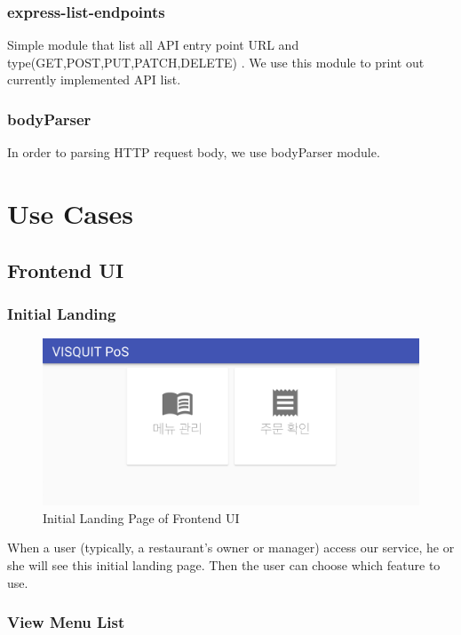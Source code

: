 \documentclass[conference,compsoc]{IEEEtran}
\begin{document}
\subsubsection{express-list-endpoints} 
Simple module that list all API entry point URL and type(GET,POST,PUT,PATCH,DELETE) . We use this module to print out currently implemented API list. 

\subsubsection{bodyParser} 
In order to parsing HTTP request body, we use bodyParser module.

\section{Use Cases}

\subsection{Frontend UI}

\subsubsection{Initial Landing}

\begin{figure}[ht!]
  \includegraphics[width=\linewidth]{figures/frontend/01-landing.png}
  \caption{Initial Landing Page of Frontend UI}
  \label{fig:01-landing}
\end{figure}

When a user (typically, a restaurant's owner or manager) access our service, he or she will see this initial landing page. Then the user can choose which feature to use.

\subsubsection{View Menu List}
\end{document}
